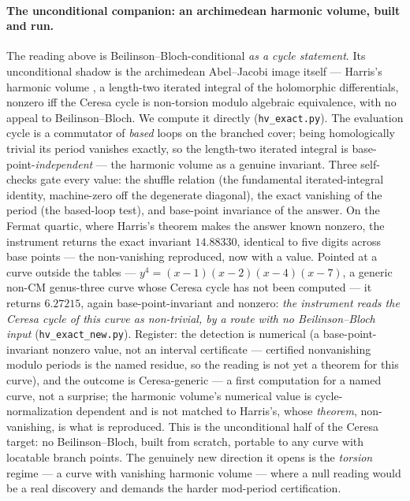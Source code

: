 \documentclass[11pt]{article}
\theoremstyle{definition}
\theoremstyle{remark}
\begin{document}
\paragraph{The unconditional companion: an archimedean harmonic volume, built
and run.} The reading above is Beilinson--Bloch-conditional \emph{as a cycle
statement}. Its unconditional shadow is the archimedean Abel--Jacobi image
itself --- Harris's harmonic volume \cite{Harris}, a length-two iterated
integral of the holomorphic differentials, nonzero iff the Ceresa cycle is
non-torsion modulo algebraic equivalence, with no appeal to Beilinson--Bloch.
We compute it directly (\texttt{hv\_exact.py}). The evaluation cycle is a
commutator of \emph{based} loops on the branched cover; being homologically
trivial its period vanishes exactly, so the length-two iterated integral is
base-point-\emph{independent} --- the harmonic volume as a genuine invariant.
Three self-checks gate every value: the shuffle relation (the fundamental
iterated-integral identity, machine-zero off the degenerate diagonal), the
exact vanishing of the period (the based-loop test), and base-point invariance
of the answer. On the Fermat quartic, where Harris's theorem makes the answer
known nonzero, the instrument returns the exact invariant $14.88330$, identical
to five digits across base points --- the non-vanishing reproduced, now with a
value. Pointed at a curve outside the tables ---
$y^4=(x-1)(x-2)(x-4)(x-7)$, a generic non-CM genus-three curve whose Ceresa
cycle has not been computed --- it returns $6.27215$, again base-point-invariant
and nonzero: \emph{the instrument reads the Ceresa cycle of this curve as
non-trivial, by a route with no Beilinson--Bloch input}
(\texttt{hv\_exact\_new.py}). Register: the detection is numerical (a
base-point-invariant nonzero value, not an interval certificate ---
certified nonvanishing modulo periods is the named residue, so the reading
is not yet a theorem for this curve),
and the outcome is Ceresa-generic --- a first computation for a named curve,
not a surprise; the harmonic volume's numerical value is cycle-normalization
dependent and is not matched to Harris's, whose \emph{theorem}, non-vanishing,
is what is reproduced. This is the unconditional half of the Ceresa target:
no Beilinson--Bloch, built from scratch, portable to any curve with locatable
branch points. The genuinely new direction it opens is the \emph{torsion}
regime --- a curve with vanishing harmonic volume --- where a null reading
would be a real discovery and demands the harder mod-period certification.
\end{document}
